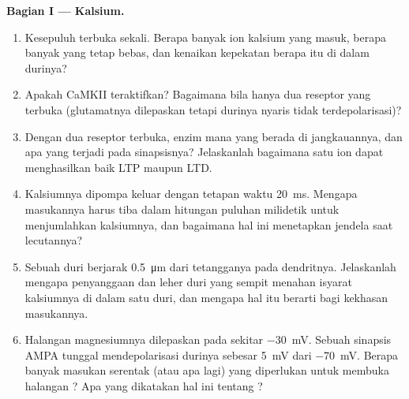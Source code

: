 \begin{problem}
\medskip
\noindent\textbf{Bagian I --- Kalsium.}
\begin{enumerate}
  \item Kesepuluh  terbuka sekali. Berapa banyak ion kalsium yang masuk,
        berapa banyak yang tetap bebas, dan kenaikan kepekatan berapa itu di dalam
        durinya?
  \item Apakah CaMKII teraktifkan? Bagaimana bila hanya dua reseptor yang terbuka
        (glutamatnya dilepaskan tetapi durinya nyaris tidak terdepolarisasi)?
  \item Dengan dua reseptor terbuka, enzim mana yang berada di jangkauannya, dan
        apa yang terjadi pada sinapsisnya? Jelaskanlah bagaimana satu ion dapat menghasilkan
        baik LTP maupun LTD.
  \item Kalsiumnya dipompa keluar dengan tetapan waktu \qty{20}{ms}.
        Mengapa masukannya harus tiba dalam hitungan puluhan milidetik untuk menjumlahkan
        kalsiumnya, dan bagaimana hal ini menetapkan jendela saat lecutannya?
  \item Sebuah duri berjarak \qty{0.5}{\micro m} dari tetangganya pada
        dendritnya. Jelaskanlah mengapa penyanggaan dan leher duri yang sempit
        menahan isyarat kalsiumnya di dalam satu duri, dan mengapa hal itu berarti bagi
        kekhasan masukannya.
  \item Halangan magnesiumnya dilepaskan pada sekitar \qty{-30}{mV}. Sebuah
        sinapsis AMPA tunggal mendepolarisasi durinya sebesar \qty{5}{mV} dari
        \qty{-70}{mV}. Berapa banyak masukan serentak (atau apa lagi) yang
        diperlukan untuk membuka halangan ? Apa yang dikatakan hal ini tentang
        ?
\end{enumerate}


\end{problem}
